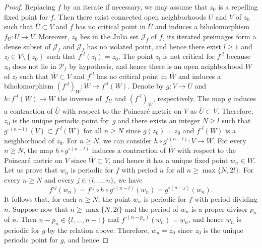 \documentclass[JEP,XML,SOM,Unicode,published]{cedram}
\theoremstyle{plain}
\theoremstyle{definition}
\theoremstyle{remark}
\begin{document}
\begin{proof}
Replacing $f$ by an iterate if necessary, we may assume that $z_{0}$ is a repelling fixed point for $f$. Then there exist connected open neighborhoods $U$ and $V$ of $z_{0}$ such that $\overline{U} \subset V$ and $f$ has no critical point in $\overline{U}$ and induces a biholomorphism $f_{U} \colon U \to V$. Moreover, $z_{0}$ lies in the Julia set $\mathcal{J}_{f}$ of $f$, its iterated preimages form a dense subset of $\mathcal{J}_{f}$ and $\mathcal{J}_{f}$ has no isolated point, and hence there exist $l \geq 1$ and $z_{l} \in V \setminus \left\lbrace z_{0} \right\rbrace$ such that $f^{\circ l}\left(z_{l} \right) = z_{0}$. The point $z_{l}$ is not critical for $f^{\circ l}$ because $z_{0}$ does not lie in $\mathcal{P}_{f}$ by hypothesis, and hence there is an open neighborhood $W$ of $z_{l}$ such that $\overline{W} \subset V$ and $f^{\circ l}$ has no critical point in $\overline{W}$ and induces a biholomorphism $\left(f^{\circ l} \right)_{W} \colon W \to f^{\circ l}(W)$. Denote by $g \colon V \to U$ and $h \colon f^{\circ l}(W) \to W$ the inverses of~$f_{U}$ and $\left(f^{\circ l} \right)_{W}$, respectively. The map $g$ induces a contraction of $\overline{U}$ with respect to the Poincaré metric on $V$ as $\overline{U} \subset V$. Therefore, $z_{0}$ is the unique periodic point for~$g$ and there exists an integer $N \geq l$ such that $g^{\circ (n -l)}(V) \subset f^{\circ l}(W)$ for all $n \geq N$ since $g(z_{0}) = z_{0}$ and $f^{\circ l}(W)$ is a neighborhood of $z_{0}$. For $n \geq N$, we can consider $h \circ g^{\circ (n -l)} \colon V \to W$. For every $n \geq N$, the map $h \circ g^{\circ (n -l)}$ induces a contraction of $\overline{W}$ with respect to the Poincaré metric on $V$ since $\overline{W} \subset V$, and hence it has a unique fixed point $w_{n} \in W$. Let us prove that $w_{n}$ is periodic for $f$ with period $n$ for all $n \geq \max\lbrace N, 2 l \rbrace$. For every $n \geq N$ and every $j \in \lbrace l, \dotsc, n \rbrace$, we have
\[
f^{\circ j}(w_{n}) = f^{\circ j} \circ h \circ g^{\circ (n -l)}(w_{n}) = g^{\circ (n -j)}(w_{n}).
\]
It follows that, for each $n \geq N$, the point $w_{n}$ is periodic for $f$ with period dividing $n$. Suppose now that $n \geq \max\lbrace N, 2 l \rbrace$ and the period of $w_{n}$ is a proper divisor $p_{n}$ of $n$. Then $n -p_{n} \in \lbrace l, \dotsc, n -1 \rbrace$ and $f^{\circ \left(n -p_{n} \right)}(w_{n}) = w_{n}$, and hence $w_{n}$ is periodic for $g$ by the relation above. Therefore, $w_{n} = z_{0}$ since $z_{0}$ is the unique periodic point for $g$, and hence

\end{proof}
\end{document}
